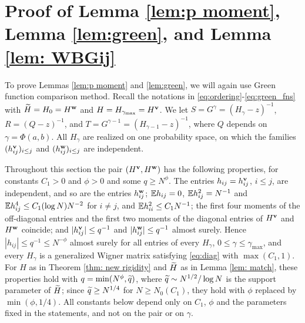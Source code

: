 \section{Proof of Lemma \ref{lem:p moment}, Lemma \ref{lem:green}, and Lemma \ref{lem: WBGij}} \label{sec7}
 
To prove Lemmas \ref{lem:p moment} and \ref{lem:green}, we will again use Green function comparison method. Recall the notations in \eqref{eq:ordering}-\eqref{eq:green_fns} with $\widetilde H=H_0 = H^{\mathbf{w}}$ and $H=H_{\gamma_{\max}} = H^{\mathbf{v}}$. We let $S=G^\gamma=(H_\gamma-z)^{-1}$, $R=(Q-z)^{-1}$, and $T=G^{\gamma-1}=(H_{\gamma-1}-z)^{-1}$, where $Q$ depends on $\gamma = \Phi(a,b)$. All $H_\gamma$ are realized on one probability space, on which the families $(h^{\mathbf{v}}_{ij})_{i\le j}$ and $(h^{\mathbf{w}}_{ij})_{i\le j}$ are independent.

Throughout this section the pair $(H^{\mathbf{v}},H^{\mathbf{w}})$ has the following properties, for constants $C_1>0$ and $\phi>0$ and some $q\ge N^{\phi}$. The entries $h_{ij}=h^{\mathbf{v}}_{ij}$, $i\le j$, are independent, and so are the entries $h^{\mathbf{w}}_{ij}$; $\mathbb{E} h_{ij}=0$, $\mathbb{E} h_{ij}^2=N^{-1}$ and $\mathbb{E} h_{ij}^4\le C_1(\log N)N^{-2}$ for $i\ne j$, and $\mathbb{E} h_{ii}^2\le C_1N^{-1}$; the first four moments of the off-diagonal entries and the first two moments of the diagonal entries of $H^{\mathbf{v}}$ and $H^{\mathbf{w}}$ coincide; and $|h^{\mathbf{v}}_{ij}|\le q^{-1}$ and $|h^{\mathbf{w}}_{ij}|\le q^{-1}$ almost surely. Hence $|h_{ij}|\le q^{-1}\le N^{-\phi}$ almost surely for all entries of every $H_\gamma$, $0\le\gamma\le\gamma_{\max}$, and every $H_\gamma$ is a generalized Wigner matrix satisfying \eqref{eq:diag} with $\max(C_1,1)$. For $H$ as in Theorem \ref{thm: new rigidity} and $\widetilde H$ as in Lemma \ref{lem: match}, these properties hold with $q=\min(N^{\phi},\widetilde q)$, where $\widetilde q\sim N^{1/2}/\log N$ is the support parameter of $\widetilde H$; since $\widetilde q\ge N^{1/4}$ for $N\ge N_0(C_1)$, they hold with $\phi$ replaced by $\min(\phi,1/4)$. All constants below depend only on $C_1$, $\phi$ and the parameters fixed in the statements, and not on the pair or on $\gamma$.

